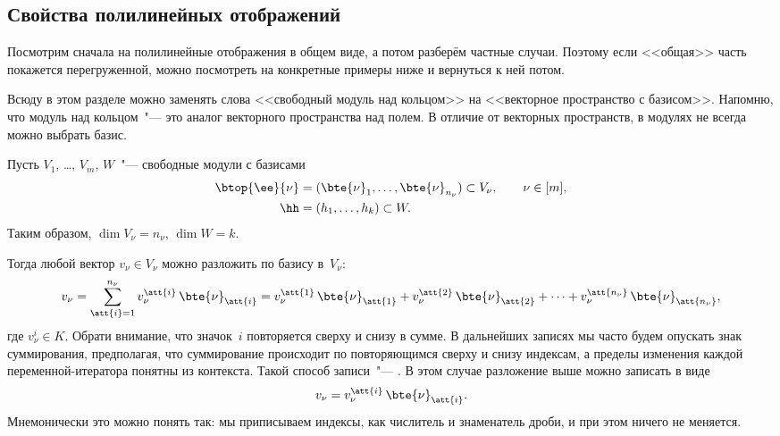 \subsection{Свойства полилинейных отображений}

Посмотрим сначала на полилинейные отображения в общем виде, а потом разберём частные случаи. Поэтому если <<общая>> часть покажется перегруженной, можно посмотреть на конкретные примеры ниже и вернуться к ней потом.

\begin{remark}
	Всюду в этом разделе можно заменять слова <<свободный модуль над кольцом>> на <<векторное пространство с базисом>>. Напомню, что модуль над кольцом~"--- это аналог векторного пространства над полем. В отличие от векторных пространств, в модулях не всегда можно выбрать базис.
\end{remark}

Пусть $V_1$, \dots, $V_m$, $W$~"--- свободные модули с базисами
\begin{align*}
	\btop{\ee}{\nu} &= (\bte{\nu}_1, \dots, \bte{\nu}_{n_\nu})
	\subset V_\nu,
	\qquad
	\nu \in [m],
	\\
	\hh &= (h_1, \dots, h_k) \subset W.
\end{align*}
Таким образом, $\dim{V_\nu} = n_\nu$, $\dim{W} = k$.

Тогда любой вектор $v_\nu \in V_\nu$ можно разложить по базису в~$V_\nu$:
\[
	v_\nu =
	\sum_{\att{i} = 1}^{n_\nu}
		v_\nu^{\att{i}}\,\bte{\nu}_{\att{i}}
	=
	v_\nu^{\att{1}}\,\bte{\nu}_{\att{1}} + 
	v_\nu^{\att{2}}\,\bte{\nu}_{\att{2}} + 
	\dots +
	v_\nu^{\att{n_\nu}}\,\bte{\nu}_{\att{n_\nu}}
	,
\]
где $v_\nu^{i} \in K$. Обрати внимание, что значок~$i$ повторяется сверху и снизу в сумме. В дальнейших записях мы часто будем опускать знак суммирования, предполагая, что суммирование происходит по повторяющимся сверху и снизу индексам, а пределы изменения каждой переменной-итератора понятны из контекста. Такой способ записи~"--- . В этом случае разложение выше можно записать в виде
\[
	v_\nu =
	v_\nu^{\att{i}}\,\bte{\nu}_{\att{i}}
	.
\]
Мнемонически это можно понять так: мы приписываем индексы, как числитель и знаменатель дроби, и при этом ничего не меняется.

